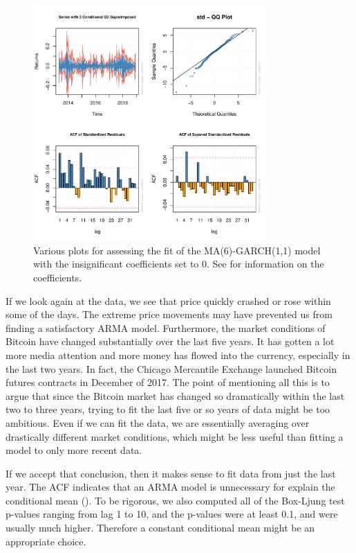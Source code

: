 \documentclass[12pt]{article}
\begin{document}
\begin{figure}[h]
    \centering
    \includegraphics[width=0.8\textwidth]{garch_five_year_fit.pdf}
    \caption{Various plots for assessing the fit of the MA(6)-GARCH(1,1) model with the insignificant coefficients set to 0. See  for information on the coefficients.}
    \label{fig:garch_five_year_fit}
\end{figure}

If we look again at the data, we see that price quickly crashed or rose within some of the days. The extreme price movements may have prevented us from finding a satisfactory ARMA model. Furthermore, the market conditions of Bitcoin have changed substantially over the last five years. It has gotten a lot more media attention and more money has flowed into the currency, especially in the last two years. In fact, the Chicago Mercantile Exchange launched Bitcoin futures contracts in December of 2017. The point of mentioning all this is to argue that since the Bitcoin market has changed so dramatically within the last two to three years, trying to fit the last five or so years of data might be too ambitious. Even if we can fit the data, we are essentially averaging over drastically different market conditions, which might be less useful than fitting a model to only more recent data.

If we accept that conclusion, then it makes sense to fit data from just the last year. The ACF indicates that an ARMA model is unnecessary for explain the conditional mean (). To be rigorous, we also computed all of the Box-Ljung test p-values ranging from lag 1 to 10, and the p-values were at least 0.1, and were usually much higher. Therefore a constant conditional mean might be an appropriate choice.
\end{document}
